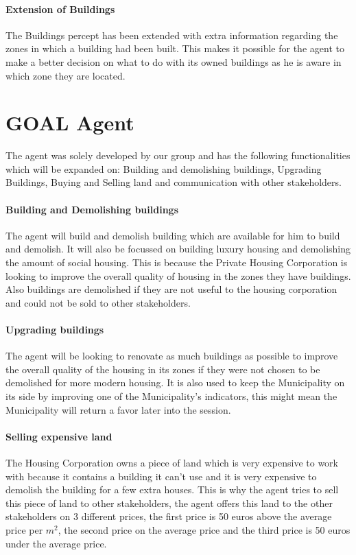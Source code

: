 \paragraph{Extension of Buildings}
The Buildings percept has been extended with extra information regarding the zones in which a building had been built. This makes it possible for the agent to make a better decision on what to do with its owned buildings as he is aware in which zone they are located.

\section{GOAL Agent}
The agent was solely developed by our group and has the following functionalities which will be expanded on: Building and demolishing buildings, Upgrading Buildings, Buying and Selling land and communication with other stakeholders.

\paragraph{Building and Demolishing buildings}
The agent will build and demolish building which are available for him to build and demolish. It will also be focussed on building luxury housing and demolishing the amount of social housing. This is because the Private Housing Corporation is looking to improve the overall quality of housing in the zones they have buildings. Also buildings are demolished if they are not useful to the housing corporation and could not be sold to other stakeholders.

\paragraph{Upgrading buildings}
The agent will be looking to renovate as much buildings as possible to improve the overall quality of the housing in its zones if they were not chosen to be demolished for more modern housing. It is also used to keep the Municipality on its side by improving one of the Municipality's indicators, this might mean the Municipality will return a favor later into the session.

\paragraph{Selling expensive land}
The Housing Corporation owns a piece of land which is very expensive to work with because it contains a building it can't use and it is very expensive to demolish the building for a few extra houses. This is why the agent tries to sell this piece of land to other stakeholders, the agent offers this land to the other stakeholders on 3 different prices, the first price is 50 euros above the average price per $m^2$, the second price on the average price and the third price is 50 euros under the average price.

